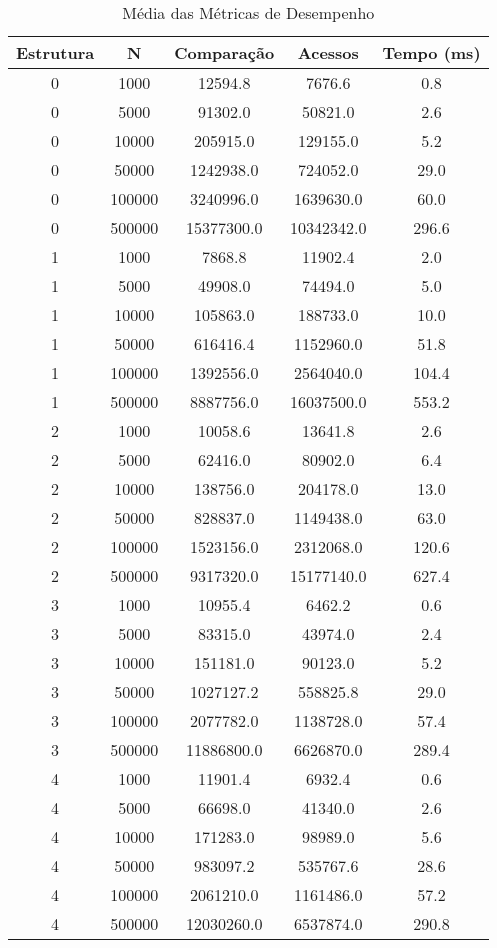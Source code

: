 \begin{table}[htbp]
\caption{Média das Métricas de Desempenho}
\label{tab:table1}
\begin{tabular}{c|c|c|c|c}
\textbf{Estrutura} & \textbf{N} & \textbf{Comparação} & \textbf{Acessos} & \textbf{Tempo (ms)}\\
\hline
0 & 1000 & 12594.8 & 7676.6 & 0.8\\
0 & 5000 & 91302.0 & 50821.0 & 2.6\\
0 & 10000 & 205915.0 & 129155.0 & 5.2\\
0 & 50000 & 1242938.0 & 724052.0 & 29.0\\
0 & 100000 & 3240996.0 & 1639630.0 & 60.0\\
0 & 500000 & 15377300.0 & 10342342.0 & 296.6\\
1 & 1000 & 7868.8 & 11902.4 & 2.0\\
1 & 5000 & 49908.0 & 74494.0 & 5.0\\
1 & 10000 & 105863.0 & 188733.0 & 10.0\\
1 & 50000 & 616416.4 & 1152960.0 & 51.8\\
1 & 100000 & 1392556.0 & 2564040.0 & 104.4\\
1 & 500000 & 8887756.0 & 16037500.0 & 553.2\\
2 & 1000 & 10058.6 & 13641.8 & 2.6\\
2 & 5000 & 62416.0 & 80902.0 & 6.4\\
2 & 10000 & 138756.0 & 204178.0 & 13.0\\
2 & 50000 & 828837.0 & 1149438.0 & 63.0\\
2 & 100000 & 1523156.0 & 2312068.0 & 120.6\\
2 & 500000 & 9317320.0 & 15177140.0 & 627.4\\
3 & 1000 & 10955.4 & 6462.2 & 0.6\\
3 & 5000 & 83315.0 & 43974.0 & 2.4\\
3 & 10000 & 151181.0 & 90123.0 & 5.2\\
3 & 50000 & 1027127.2 & 558825.8 & 29.0\\
3 & 100000 & 2077782.0 & 1138728.0 & 57.4\\
3 & 500000 & 11886800.0 & 6626870.0 & 289.4\\
4 & 1000 & 11901.4 & 6932.4 & 0.6\\
4 & 5000 & 66698.0 & 41340.0 & 2.6\\
4 & 10000 & 171283.0 & 98989.0 & 5.6\\
4 & 50000 & 983097.2 & 535767.6 & 28.6\\
4 & 100000 & 2061210.0 & 1161486.0 & 57.2\\
4 & 500000 & 12030260.0 & 6537874.0 & 290.8\\
\end{tabular}
\end{table}
